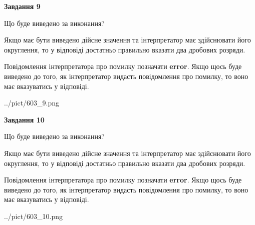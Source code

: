 \documentclass[12pt, ukrainian]{article}
\begin{document}
{\begin {Large}
{\begin {center}\textbf{Завдання 9}\end {center}}\par
Що буде виведено за виконання? \par

Якщо має бути виведено дійсне значення та інтерпретатор має здійснювати його округлення, 
то у відповіді достатньо правильно вказати два дробових розряди.

Повідомлення інтерпретатора про помилку позначати \textbf{error}.
Якщо щось буде виведено до того, як інтерпретатор видасть повідомлення про помилку, 
то воно має вказуватись у відповіді. \par

\begin{center}
	{../pict/603_9.png}
\end{center}
\newpage

{\begin {center}\textbf{Завдання 10}\end {center}}\par
Що буде виведено за виконання? \par

Якщо має бути виведено дійсне значення та інтерпретатор має здійснювати його округлення, 
то у відповіді достатньо правильно вказати два дробових розряди.

Повідомлення інтерпретатора про помилку позначати \textbf{error}.
Якщо щось буде виведено до того, як інтерпретатор видасть повідомлення про помилку, 
то воно має вказуватись у відповіді. \par

\begin{center}
	{../pict/603_10.png}
\end{center}
\newpage

\end {Large}}
\end{document}
